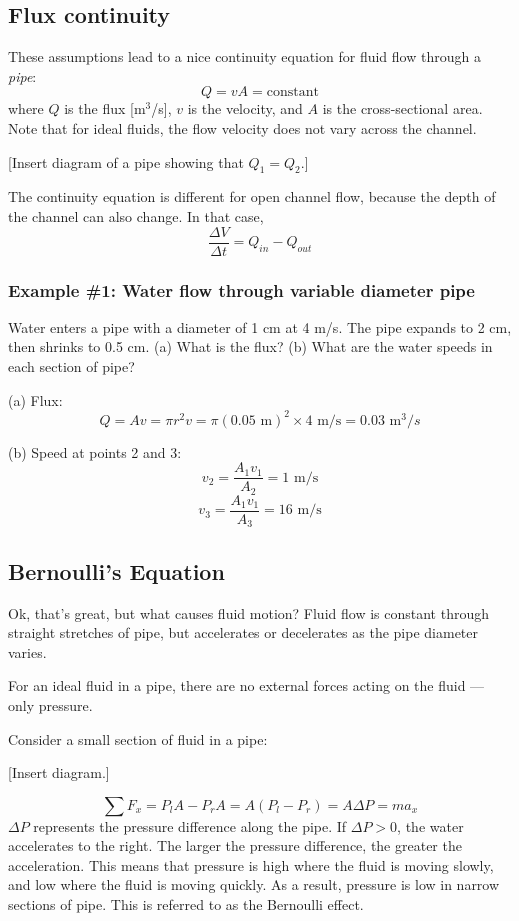 \subsection{Flux continuity}
These assumptions lead to a nice continuity equation for fluid flow through a \textit{pipe}:
$$Q=vA=\mbox{constant}$$
where $Q$ is the flux [m$^3$/s], $v$ is the velocity, and $A$ is the cross-sectional area. Note that for ideal fluids, the flow velocity does not vary across the channel.

[Insert diagram of a pipe showing that $Q_1=Q_2$.]\nopagebreak
\vspace{4cm}

The continuity equation is different for open channel flow, because the depth of the channel can also change. In that case,
$$\frac{\Delta V}{\Delta t}=Q_{in}-Q_{out}$$

\subsubsection{Example \#1: Water flow through variable diameter pipe}
Water enters a pipe with a diameter of 1 cm at 4 m/s. The pipe expands to 2 cm, then shrinks to 0.5 cm. (a) What is the flux? (b) What are the water speeds in each section of pipe?

(a) Flux:
$$Q=Av=\pi r^2v=\pi(0.05\mbox{ m})^2\times 4\mbox{ m/s}=0.03\mbox{ m}^3/s$$

(b) Speed at points 2 and 3:
$$v_2=\frac{A_1v_1}{A_2}=1\mbox{ m/s}$$
$$v_3=\frac{A_1v_1}{A_3}=16\mbox{ m/s}$$


\subsection{Bernoulli's Equation}
Ok, that's great, but what causes fluid motion? Fluid flow is constant through straight stretches of pipe, but accelerates or decelerates as the pipe diameter varies.

For an ideal fluid in a pipe, there are no external forces acting on the fluid --- only pressure.

Consider a small section of fluid in a pipe:

[Insert diagram.]\nopagebreak
\vspace{5cm}


$$\sum F_x=P_lA-P_rA=A(P_l-P_r)=A\Delta{P}=ma_x$$
$\Delta{P}$ represents the pressure difference along the pipe. If $\Delta{P}>0$, the water accelerates to the right. The larger the pressure difference, the greater the acceleration. This means that pressure is high where the fluid is moving slowly, and low where the fluid is moving quickly. As a result, pressure is low in narrow sections of pipe. This is referred to as the Bernoulli effect.

